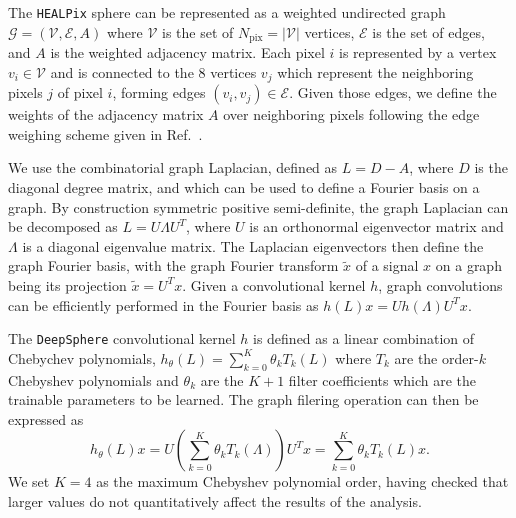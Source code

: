 \documentclass[prd,aps,10pt,nofootinbib,twocolumn,superscriptaddress,preprintnumbers,balancelastpage,longbibliography]{revtex4-1}
\begin{document}
The \texttt{HEALPix} sphere can be represented as a weighted undirected graph $\mathcal G = (\mathcal V, \mathcal E, A)$ where $\mathcal V$ is the set of $N_\mathrm{pix} = |\mathcal V|$ vertices, $\mathcal E$ is the set of edges, and $A$ is the weighted adjacency matrix. Each pixel $i$ is represented by a vertex $v_i \in \mathcal V$ and is connected to the 8 %
vertices $v_j$ which represent the neighboring pixels $j$ of pixel $i$, forming edges $(v_i
, v_j) \in \mathcal E$. Given those edges, we define the weights of the adjacency matrix $A$ over neighboring pixels following the edge weighing scheme given in Ref.~\cite{defferrard2020deepsphere}.

We use the combinatorial graph Laplacian, defined as $ L =  D -  A$, where $ D$ is the diagonal degree matrix, and which can be used to define a Fourier basis on a graph. By construction symmetric positive semi-definite, the graph Laplacian can be decomposed as $ L =  U  \Lambda  U^T$, where $ U$ is an orthonormal eigenvector matrix and $ \Lambda$ is a diagonal eigenvalue matrix. The Laplacian eigenvectors then define the graph Fourier basis, with the graph Fourier transform $\tilde{ x}$ of a signal $ x$ on a graph being its projection $\tilde{x} =  U^T  x$.
Given a convolutional kernel $h$, graph convolutions can be efficiently performed in the Fourier basis as $h({L}) {x}={U} h({\Lambda}) {U}^{T} {x}$.

The \texttt{DeepSphere} convolutional kernel $h$ is defined as a linear combination of Chebychev polynomials, $h_{\theta}({{L}}) = \sum_{k=0}^{K} \theta_{k} T_{k}({{L}})$ where $T_k$ are the order-$k$ Chebyshev polynomials and $\theta_k$ are the $K + 1$ filter coefficients which are the trainable parameters to be learned. The graph filering operation can then be expressed as
\begin{equation}
h_{\theta}({L}) {x}={U}\left(\sum_{k=0}^{K} \theta_{k} T_k({\Lambda})\right) {U}^{T} {x}=\sum_{k=0}^{K} \theta_{k} T_k({L}) {x}.
\end{equation}
We set $K=4$ as the maximum Chebyshev polynomial order, having checked that larger values do not quantitatively affect the results of the analysis.
\end{document}
